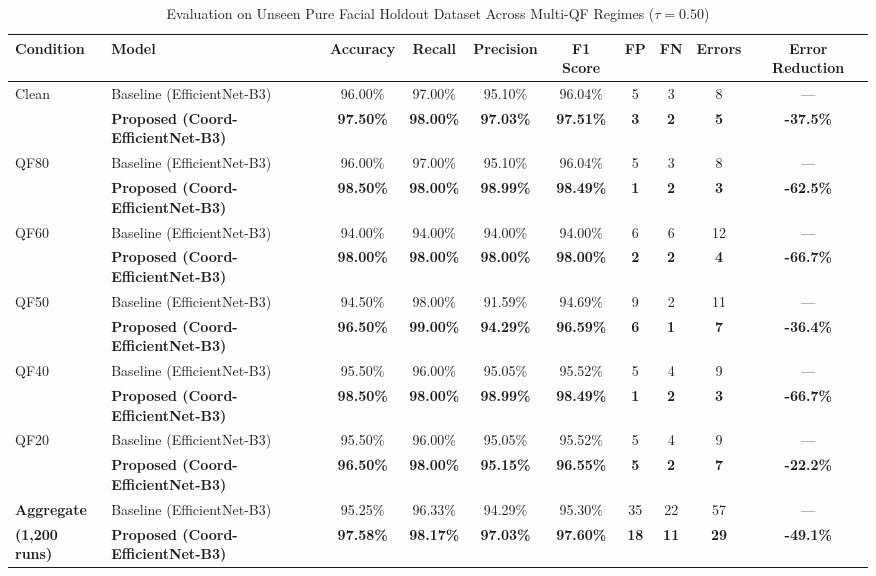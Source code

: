 \documentclass[conference]{IEEEtran}
\begin{document}
\begin{table}[t]
\caption{Evaluation on Unseen Pure Facial Holdout Dataset Across Multi-QF Regimes ($\tau = 0.50$)}
\label{tab:holdout}
\centering
\begin{tabular}{llcccccccc}
\toprule
\textbf{Condition} & \textbf{Model} & \textbf{Accuracy} & \textbf{Recall} & \textbf{Precision} & \textbf{F1 Score} & \textbf{FP} & \textbf{FN} & \textbf{Errors} & \textbf{Error Reduction} \\
\midrule
Clean & Baseline (EfficientNet-B3) & 96.00\% & 97.00\% & 95.10\% & 96.04\% & 5 & 3 & 8 & --- \\
      & \textbf{Proposed (Coord-EfficientNet-B3)} & \textbf{97.50\%} & \textbf{98.00\%} & \textbf{97.03\%} & \textbf{97.51\%} & \textbf{3} & \textbf{2} & \textbf{5} & \textbf{-37.5\%} \\
\midrule
QF80  & Baseline (EfficientNet-B3) & 96.00\% & 97.00\% & 95.10\% & 96.04\% & 5 & 3 & 8 & --- \\
      & \textbf{Proposed (Coord-EfficientNet-B3)} & \textbf{98.50\%} & \textbf{98.00\%} & \textbf{98.99\%} & \textbf{98.49\%} & \textbf{1} & \textbf{2} & \textbf{3} & \textbf{-62.5\%} \\
\midrule
QF60  & Baseline (EfficientNet-B3) & 94.00\% & 94.00\% & 94.00\% & 94.00\% & 6 & 6 & 12 & --- \\
      & \textbf{Proposed (Coord-EfficientNet-B3)} & \textbf{98.00\%} & \textbf{98.00\%} & \textbf{98.00\%} & \textbf{98.00\%} & \textbf{2} & \textbf{2} & \textbf{4} & \textbf{-66.7\%} \\
\midrule
QF50  & Baseline (EfficientNet-B3) & 94.50\% & 98.00\% & 91.59\% & 94.69\% & 9 & 2 & 11 & --- \\
      & \textbf{Proposed (Coord-EfficientNet-B3)} & \textbf{96.50\%} & \textbf{99.00\%} & \textbf{94.29\%} & \textbf{96.59\%} & \textbf{6} & \textbf{1} & \textbf{7} & \textbf{-36.4\%} \\
\midrule
QF40  & Baseline (EfficientNet-B3) & 95.50\% & 96.00\% & 95.05\% & 95.52\% & 5 & 4 & 9 & --- \\
      & \textbf{Proposed (Coord-EfficientNet-B3)} & \textbf{98.50\%} & \textbf{98.00\%} & \textbf{98.99\%} & \textbf{98.49\%} & \textbf{1} & \textbf{2} & \textbf{3} & \textbf{-66.7\%} \\
\midrule
QF20  & Baseline (EfficientNet-B3) & 95.50\% & 96.00\% & 95.05\% & 95.52\% & 5 & 4 & 9 & --- \\
      & \textbf{Proposed (Coord-EfficientNet-B3)} & \textbf{96.50\%} & \textbf{98.00\%} & \textbf{95.15\%} & \textbf{96.55\%} & \textbf{5} & \textbf{2} & \textbf{7} & \textbf{-22.2\%} \\
\midrule
\textbf{Aggregate} & Baseline (EfficientNet-B3) & 95.25\% & 96.33\% & 94.29\% & 95.30\% & 35 & 22 & 57 & --- \\
\textbf{(1,200 runs)} & \textbf{Proposed (Coord-EfficientNet-B3)} & \textbf{97.58\%} & \textbf{98.17\%} & \textbf{97.03\%} & \textbf{97.60\%} & \textbf{18} & \textbf{11} & \textbf{29} & \textbf{-49.1\%} \\
\bottomrule
\end{tabular}
\end{table}
\end{document}
